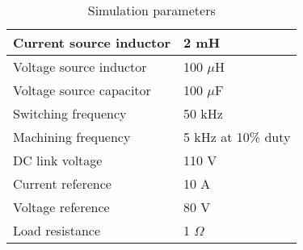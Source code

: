 \begin{comment}
			\caption{Direct duty ratio control: Q2,D2}
		\end{figure}
		Figure \ref{fig:sim-q3} shows the voltage across $Q_3$ and current through $Q_3$ waveforms when direct duty ratio control is used. The maximum voltage across $Q_3$ is 110 V and the maximum current through it is 4.5 A. Figure \ref{fig:sim-d3} shows the voltage across $D_3$ and current through $D_3$ waveforms when direct duty ratio control is used. The maximum reverse voltage across $D_3$ is 110 V and the maximum current through it is 21 A.
		\begin{figure}[H]
			\begin{subfigure}{0.49\textwidth}
				\centering
				\texttt{[image: Q3]}
				\caption{Voltage and current of Q3}
				\label{fig:sim-q3}
			\end{subfigure}
			\begin{subfigure}{0.49\textwidth}
				\centering
				\texttt{[image: D3]}
				\caption{Voltage and current of D3}
				\label{fig:sim-d3}
			\end{subfigure}
			\caption{Direct duty ratio control: Q3,D3}
		\end{figure}
	\end{comment}
	\begin{table}[H]
		\centering
			\begin{tabular}{|l|l|} \hline
				Current source inductor & 2 mH \\ \hline
				Voltage source inductor & 100 $\mu$H \\ \hline
				Voltage source capacitor & 100 $\mu$F \\ \hline
				Switching frequency & 50 kHz \\ \hline
				Machining frequency & 5 kHz at 10\% duty \\ \hline
				DC link voltage & 110 V \\ \hline
				Current reference & 10 A \\ \hline
				Voltage reference & 80 V \\ \hline
				Load resistance & 1 $\Omega$ \\ \hline
			\end{tabular}
		\caption{Simulation parameters}
		\label{tab:sim1-param}
	\end{table}
